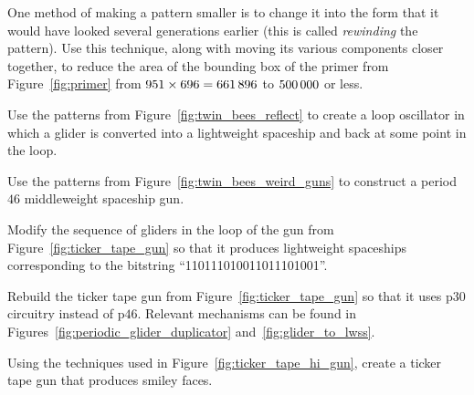 \begin{multicols}{2}
	\mfilbreak
	
	
	\begin{problem}\label{exer:rewind_primer} 
		One method of making a pattern smaller is to change it into the form that it would have looked several generations earlier (this is called \emph{rewinding} the pattern). Use this technique, along with moving its various components closer together, to reduce the area of the bounding box of the primer from Figure~\ref{fig:primer} from $951 \times 696 = 661{\,}896$ to $500{\,}000$ or less.
	\end{problem}
	
	
	\mfilbreak
	
	
	\begin{problem}\label{exer:twin_bees_loop} 
		Use the patterns from Figure~\ref{fig:twin_bees_reflect} to create a loop oscillator in which a glider is converted into a lightweight spaceship and back at some point in the loop.
	\end{problem}
	
	
	\mfilbreak
	
	
	\begin{problem}\label{exer:twin_bees_mwss_gun} 
		Use the patterns from Figure~\ref{fig:twin_bees_weird_guns} to construct a period~$46$ middleweight spaceship gun.
	\end{problem}
	
	
	\mfilbreak
	
	
	\begin{problem}\label{exer:ticker_tape_gun_store_different} 
		Modify the sequence of gliders in the loop of the gun from Figure~\ref{fig:ticker_tape_gun} so that it produces lightweight spaceships corresponding to the bitstring ``110111010011011101001''.
	\end{problem}


	\mfilbreak
	
	
	\begin{problem}\label{exer:p30_ticker_tape_gun} 
		Rebuild the ticker tape gun from Figure~\ref{fig:ticker_tape_gun} so that it uses p$30$ circuitry instead of p$46$. Relevant mechanisms can be found in Figures~\ref{fig:periodic_glider_duplicator} and~\ref{fig:glider_to_lwss}.
	\end{problem}
	
	
	\mfilbreak
	
	
	\begin{problem}\label{exer:ticker_tape_smiley_gun} 
		Using the techniques used in Figure~\ref{fig:ticker_tape_hi_gun}, create a ticker tape gun that produces smiley faces.
	\end{problem}
	

\end{multicols}
